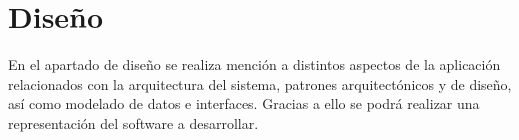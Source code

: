 \chapter{Diseño}

En el apartado de diseño se realiza mención a distintos aspectos de la aplicación relacionados con la arquitectura del sistema, patrones arquitectónicos y de diseño, así como modelado de datos e interfaces. Gracias a ello se podrá realizar una representación del software a desarrollar.


